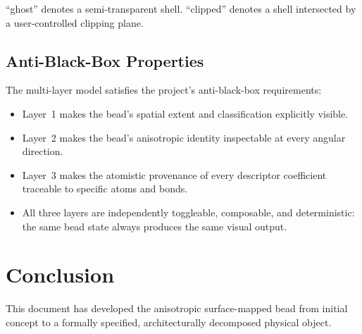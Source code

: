 \documentclass[11pt]{article}
\begin{document}
\noindent
``ghost'' denotes a semi-transparent shell.  ``clipped'' denotes a shell
intersected by a user-controlled clipping plane.

\subsection{Anti-Black-Box Properties}

The multi-layer model satisfies the project's anti-black-box requirements:
\begin{itemize}
    \item Layer~1 makes the bead's spatial extent and classification
          explicitly visible.
    \item Layer~2 makes the bead's anisotropic identity inspectable at every
          angular direction.
    \item Layer~3 makes the atomistic provenance of every descriptor
          coefficient traceable to specific atoms and bonds.
    \item All three layers are independently toggleable, composable, and
          deterministic: the same bead state always produces the same visual
          output.
\end{itemize}

\section{Conclusion}

This document has developed the anisotropic surface-mapped bead from initial
concept to a formally specified, architecturally decomposed physical object.
\end{document}

